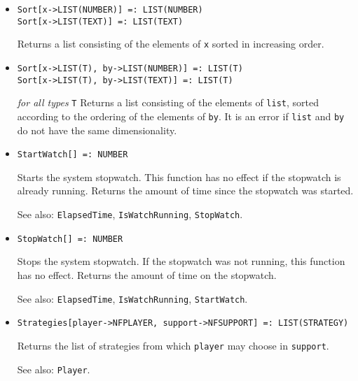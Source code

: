 \begin{itemize}
\item{}
\protect \large \begin{verbatim}
Sort[x->LIST(NUMBER)] =: LIST(NUMBER)
Sort[x->LIST(TEXT)] =: LIST(TEXT)
\end{verbatim} \normalsize

\bd
Returns a list consisting of the elements of \verb+x+ sorted in
increasing order.
\ed

\item{}
\protect \large \begin{verbatim}
Sort[x->LIST(T), by->LIST(NUMBER)] =: LIST(T)
Sort[x->LIST(T), by->LIST(TEXT)] =: LIST(T)
\end{verbatim} \normalsize

{\it for all types} {\tt T}
\bd
Returns a list consisting of the elements of \verb+list+, sorted
according to the ordering of the elements of \verb+by+.  It is an
error if \verb+list+ and \verb+by+ do not have the same dimensionality.
\ed

\item{}
\protect \large \begin{verbatim}
StartWatch[] =: NUMBER 
\end{verbatim}\normalsize

\bd
Starts the system stopwatch.  This function has no
effect if the stopwatch is already running.
Returns the amount of time since the stopwatch was started.
\item [See also:] \verb+ElapsedTime+, \verb+IsWatchRunning+, \verb+StopWatch+.
\ed

\item{}
\protect \large \begin{verbatim}
StopWatch[] =: NUMBER 
\end{verbatim}\normalsize

\bd
Stops the system stopwatch.  If the stopwatch was not
running, this function has no effect.  Returns the amount of time
on the stopwatch.
\item [See also:] \verb+ElapsedTime+, \verb+IsWatchRunning+,
\verb+StartWatch+.
\ed

\item{}
\protect \large \begin{verbatim}
Strategies[player->NFPLAYER, support->NFSUPPORT] =: LIST(STRATEGY) 
\end{verbatim}\normalsize

\bd
Returns the list of strategies from which  \verb+player+ may choose
in \verb+support+.
\item [See also:] \verb+Player+. 
\ed


\end{itemize}
